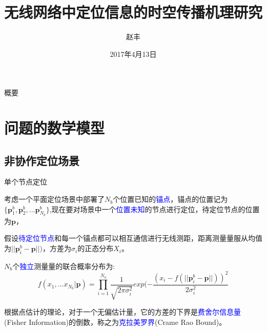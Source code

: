 \documentclass[notheorems,xetex,mathserif,serif]{beamer}
\title[机理研究\insertframenumber/\inserttotalframenumber] %
{无线网络中定位信息的时空传播机理研究}
\author[赵丰] %
{赵丰}
\institute[清华大学] %
{
  数学科学系\\
  清华大学\\
  \quad\\
  指导老师:\\
  电子工程系\\
  沈渊
}
\date{2017年4月13日}
\begin{document}
\begin{frame}
  \titlepage
\end{frame}

\begin{frame}{概要}
  \tableofcontents
\end{frame}




\section{问题的数学模型}

\subsection[非协作定位场景]{非协作定位场景}

\begin{frame}{单个节点定位}

        考虑一个平面定位场景中部署了$N_b$个位置已知的\textcolor{blue}{锚点}，锚点的位置记为$\{\bm{p}^b_1,\bm{p}^b_2,...\bm{p}^b_{N_b}\}$,现在要对场景中一个\textcolor{blue}{位置未知}的节点进行定位，待定位节点的位置为$\bm{p}$，

假设\textcolor{blue}{待定位节点}和每一个锚点都可以相互通信进行无线测距，距离测量量服从均值为$||\bm{p}^b_i-\bm{p}||)$，方差为$\sigma_i$的正态分布$X_i$。

$N_b$个\textcolor{blue}{独立}测量量的联合概率分布为:
\begin{equation}\label{eq:single}
f(x_1,...x_{N_b}|\textbf{p})=\prod_{i=1}^{N_b}\frac{1}{\sqrt{2\pi\sigma_i^2}}exp(-\frac{(x_i-f(||\bm{p}^b_i-\bm{p}||))^2}{2\sigma_i^2}
\end{equation}

根据点估计的理论，对于一个无偏估计量，它的方差的下界是\textcolor{blue}{费舍尔信息量}(Fisher Information)的倒数，称之为\textcolor{blue}{克拉美罗界}(Crame Rao Bound)。
\end{frame}
\end{document}

